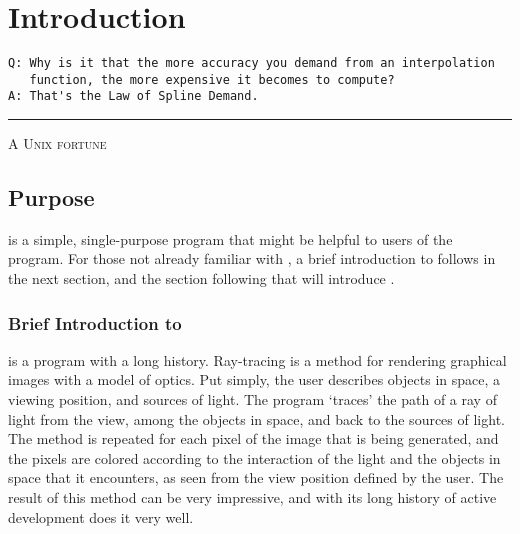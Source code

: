 \chapter{Introduction}
\label{chap:introduction}

\ifMKwx
	\small
\begin{verbatim}
Q: Why is it that the more accuracy you demand from an interpolation
   function, the more expensive it becomes to compute?
A: That's the Law of Spline Demand.
\end{verbatim}%
	\hrule
	\textsc{A Unix fortune}
	\normalsize
\else
\fi %

\section{Purpose}%
	\label{sec:epspline_purpose}
\IXpkgu{} is a simple, single-purpose program that might
be helpful to users of the \IXpov{} program.
For those not already familiar with \IXpov{},
a brief introduction to \IXpov{} follows in the next section,
and the section following that will introduce \IXpkg.

	\subsection{Brief Introduction to \dtypov}
	\label{ssec:intro_povray}
\IXpov{} is a  program with a long history.
Ray-tracing is a method for rendering
graphical images with a model of optics.
Put simply, the user describes objects in space, a viewing position,
and sources of light. The program `traces' the path of a ray of
light from the view, among the objects in space, and back to the sources
of light. The method is repeated for each pixel of the image that
is being generated, and the pixels are colored according to the
interaction of the light and the objects in space that it encounters,
as seen from the view position defined by the user.
The result of this method can be very impressive, and with its
long history of active development \IXpov{} does it very well.

